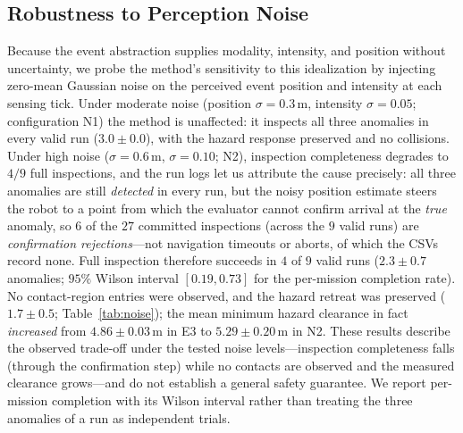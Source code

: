\subsection{Robustness to Perception Noise}
\label{sec:robustness}
Because the event abstraction supplies modality, intensity, and position without
uncertainty, we probe the method's sensitivity to this idealization by injecting
zero-mean Gaussian noise on the perceived event position and intensity at each
sensing tick. Under moderate noise (position $\sigma=0.3$\,m, intensity
$\sigma=0.05$; configuration N1) the method is unaffected: it inspects all three
anomalies in every valid run ($3.0\pm0.0$), with the hazard response preserved and
no collisions. Under high noise ($\sigma=0.6$\,m, $\sigma=0.10$; N2), inspection
completeness degrades to $4/9$ full inspections, and the run logs let us attribute
the cause precisely: all three anomalies are still \emph{detected} in every run, but
the noisy position estimate steers the robot to a point from which the evaluator
cannot confirm arrival at the \emph{true} anomaly, so $6$ of the $27$ committed
inspections (across the $9$ valid runs) are \emph{confirmation rejections}---not
navigation timeouts or aborts, of which the CSVs record none. Full inspection
therefore succeeds in $4$ of $9$ valid runs ($2.3\pm0.7$ anomalies; $95\%$ Wilson
interval $[0.19,0.73]$ for the per-mission completion rate). No contact-region
entries were observed, and the hazard retreat was preserved ($1.7\pm0.5$;
Table~\ref{tab:noise}); the mean minimum hazard clearance in fact \emph{increased}
from $4.86\pm0.03$\,m in E3 to $5.29\pm0.20$\,m in N2. These results describe the
observed trade-off under the tested noise levels---inspection completeness falls
(through the confirmation step) while no contacts are observed and the measured
clearance grows---and do not establish a general safety guarantee. We report per-mission completion with its Wilson
interval rather than treating the three anomalies of a run as independent trials.

